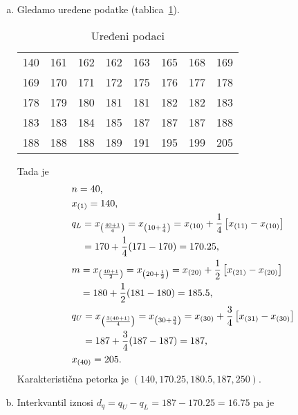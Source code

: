\documentclass[12pt]{scrartcl}
\begin{document}
\begin{rjesenje}
\begin{enumerate}[(a)]
    \item Gledamo uređene podatke (tablica~\ref{tbl:urpodaci}).
\begin{table}[ht]
\centering
\begin{tabular}{llllllll}
140 & 161 & 162 & 162 & 163 & 165 & 168 & 169 \\
169 & 170 & 171 & 172 & 175 & 176 & 177 & 178 \\
178 & 179 & 180 & 181 & 181 & 182 & 182 & 183 \\
183 & 183 & 184 & 185 & 187 & 187 & 187 & 188 \\
188 & 188 & 188 & 189 & 191 & 195 & 199 & 205
\end{tabular}
\caption{Uređeni podaci}
\label{tbl:urpodaci}
\end{table}
Tada je
\begin{align}
    &n=40\text, \\
    &x_{(1)}=140\text, \\
    &\begin{aligned}
    q_L&=x_{\left(\frac{40+1}{4}\right)}=x_{\left(10+\frac{1}{4}\right)}=x_{(10)}+\dfrac{1}{4}\left[x_{(11)}-x_{(10)}\right]\\
    &=170+\dfrac{1}{4}(171-170)=170.25\text,\\
    \end{aligned}\\
    &\begin{aligned}
    m&=x_{\left(\frac{40+1}{2}\right)}=x_{\left(20+\frac{1}{2}\right)}=x_{(20)}+\dfrac{1}{2}\left[x_{(21)}-x_{(20)}\right]\\
    &=180+\dfrac{1}{2}(181-180)=185.5\text,\\
    \end{aligned}\\
    &\begin{aligned}
    q_U&=x_{\left(\frac{3(40+1)}{4}\right)}=x_{\left(30+\frac{3}{4}\right)}=x_{(30)}+\dfrac{3}{4}\left[x_{(31)}-x_{(30)}\right]\\
    &=187+\dfrac{3}{4}(187-187)=187\text,\\
    \end{aligned}\\
    &x_{(40)}=205\text.
\end{align}
Karakteristična petorka je $\left(140,170.25,180.5,187,250\right)$.
\item Interkvantil iznosi $d_q=q_U-q_L=187-170.25=16.75$ pa je
\begin{gather}

\end{gather}
\end{enumerate}
\end{rjesenje}
\end{document}
